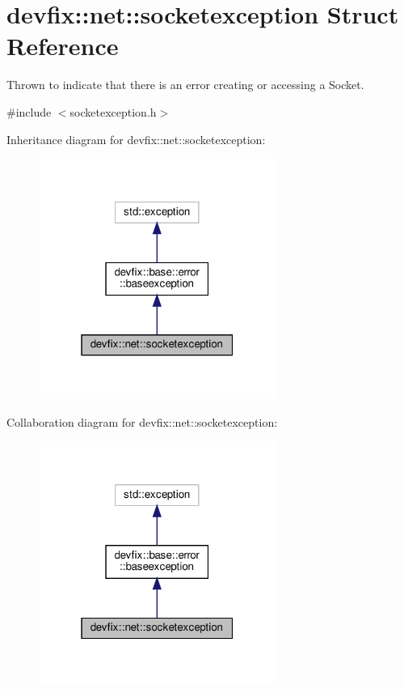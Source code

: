\hypertarget{structdevfix_1_1net_1_1socketexception}{}\section{devfix\+:\+:net\+:\+:socketexception Struct Reference}
\label{structdevfix_1_1net_1_1socketexception}


Thrown to indicate that there is an error creating or accessing a Socket.  




{\ttfamily \#include $<$socketexception.\+h$>$}



Inheritance diagram for devfix\+:\+:net\+:\+:socketexception\+:
\nopagebreak
\begin{figure}[H]
\begin{center}
\leavevmode
\includegraphics[width=220pt]{structdevfix_1_1net_1_1socketexception__inherit__graph}
\end{center}
\end{figure}


Collaboration diagram for devfix\+:\+:net\+:\+:socketexception\+:
\nopagebreak
\begin{figure}[H]
\begin{center}
\leavevmode
\includegraphics[width=220pt]{structdevfix_1_1net_1_1socketexception__coll__graph}
\end{center}
\end{figure}
